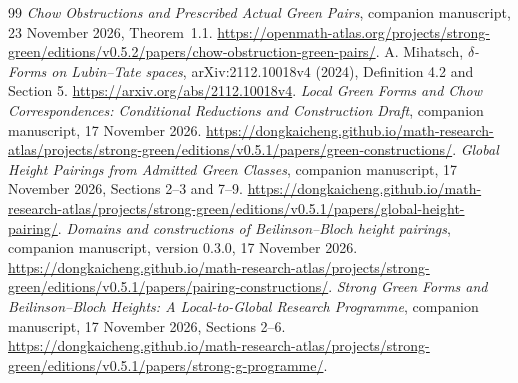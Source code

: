 \documentclass[11pt,a4paper]{article}
\theoremstyle{definition}
\numberwithin{equation}{section}
\begin{document}
\begin{thebibliography}{99}
 \emph{Chow Obstructions and Prescribed Actual Green Pairs}, companion manuscript, 23 November 2026, Theorem~1.1. \url{https://openmath-atlas.org/projects/strong-green/editions/v0.5.2/papers/chow-obstruction-green-pairs/}.
 A. Mihatsch, \emph{$\delta$-Forms on Lubin--Tate spaces}, arXiv:2112.10018v4 (2024), Definition 4.2 and Section 5. \url{https://arxiv.org/abs/2112.10018v4}.
 \emph{Local Green Forms and Chow Correspondences: Conditional Reductions and Construction Draft}, companion manuscript, 17 November 2026. \url{https://dongkaicheng.github.io/math-research-atlas/projects/strong-green/editions/v0.5.1/papers/green-constructions/}.
 \emph{Global Height Pairings from Admitted Green Classes}, companion manuscript, 17 November 2026, Sections 2--3 and 7--9. \url{https://dongkaicheng.github.io/math-research-atlas/projects/strong-green/editions/v0.5.1/papers/global-height-pairing/}.
 \emph{Domains and constructions of Beilinson--Bloch height pairings}, companion manuscript, version 0.3.0, 17 November 2026. \url{https://dongkaicheng.github.io/math-research-atlas/projects/strong-green/editions/v0.5.1/papers/pairing-constructions/}.
 \emph{Strong Green Forms and Beilinson--Bloch Heights: A Local-to-Global Research Programme}, companion manuscript, 17 November 2026, Sections 2--6. \url{https://dongkaicheng.github.io/math-research-atlas/projects/strong-green/editions/v0.5.1/papers/strong-g-programme/}.
\end{thebibliography}
\end{document}
